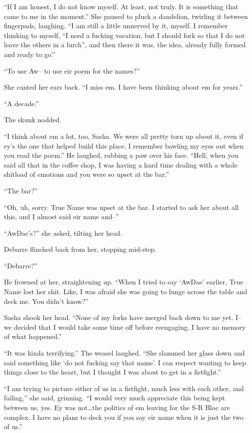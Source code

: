 ``If I am honest, I do not know myself. At least, not truly. It is something that came to me in the moment.'' She paused to pluck a dandelion, twirling it between fingerpads, laughing. ``I am still a little unnerved by it, myself. I remember thinking to myself, ``I need a fucking vacation, but I should fork so that I do not leave the others in a lurch'', and then there it was, the idea, already fully formed and ready to go.''

``To use Aw-- to use eir poem for the names?''

She canted her ears back. ``I miss em. I have been thinking about em for years.''

``A decade.''

The skunk nodded.

``I think about em a lot, too, Sasha. We were all pretty torn up about it, even if ey's the one that helped build this place. I remember bawling my eyes out when you read the poem.'' He laughed, rubbing a paw over his face. ``Hell, when you said all that in the coffee shop, I was having a hard time dealing with a whole shitload of emotions and you were so upset at the bar.''

``The bar?''

``Oh, uh, sorry. True Name was upset at the bar. I started to ask her about all this, and I almost said eir name and--''

``AwDae's?'' she asked, tilting her head.

Debarre flinched back from her, stopping mid-step.

``Debarre?''

He frowned at her, straightening up. ``When I tried to say `AwDae' earlier, True Name lost her shit. Like, I was afraid she was going to lunge across the table and deck me. You didn't know?''

Sasha shook her head. ``None of my forks have merged back down to me yet. I-- we decided that I would take some time off before reengaging. I have no memory of what happened.''

``It was kinda terrifying.'' The weasel laughed. ``She slammed her glass down and said something like `do not fucking say that name'. I can respect wanting to keep things close to the heart, but I thought I was about to get in a fistfight.''

``I am trying to picture either of us in a fistfight, much less with each other, and failing,'' she said, grinning. ``I would very much appreciate this being kept between us, yes. Ey was not\ldots{}the politics of em leaving for the S-R Bloc are complex. I have no plans to deck you if you say eir name when it is just the two of us.''

